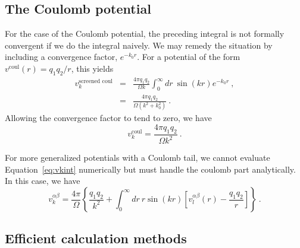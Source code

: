 \subsection{The Coulomb potential}
For the case of the Coulomb potential, the preceding integral is not
formally convergent if we do the integral naively. We may remedy the
situation by including a convergence factor, $e^{-k_0 r}$.  For a
potential of the form $v^{\text{coul}}(r) = q_1 q_2/r$, this yields
\begin{eqnarray}
v^{\text{screened coul}}_k & = & \frac{4\pi q_1 q_2}{\Omega k} \int_0^\infty dr\ \sin(kr)
e^{-k_0r}\:, \\ 
& = & \frac{4\pi q_1 q_2}{\Omega (k^2 + k_0^2)}\:.
\end{eqnarray}
Allowing the convergence factor to tend to zero, we have
\begin{equation}
v_k^\text{coul} = \frac{4 \pi q_1 q_2}{\Omega k^2}\:.
\end{equation}

For more generalized potentials with a Coulomb tail, we cannot
evaluate Equation~\ref{eq:vkint} numerically but must handle the coulomb part
analytically.  In this case, we have
\begin{equation}
v_k^{\alpha \beta} = \frac{4\pi}{\Omega} 
\left\{ \frac{q_1 q_2}{k^2} + \int_0^\infty dr \ r \sin(kr) \left[ v_l^{\alpha \beta}(r) -
  \frac{q_1 q_2}{r} \right] \right\}\:.
\end{equation}

\subsection{Efficient calculation methods}
